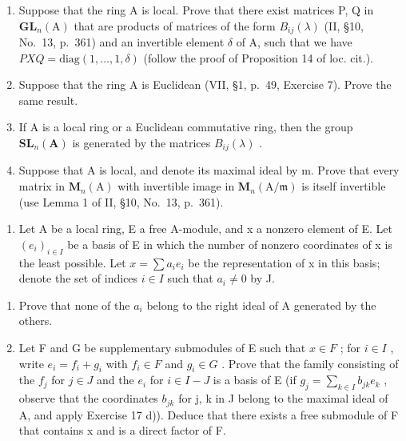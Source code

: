 \begin{enumerate}
\def\labelenumi{\alph{enumi})}
\item
  Suppose that the ring A is local. Prove that there exist matrices P, Q in \(\mathbf{GL}_{n}(\mathrm{A})\) that are products of matrices of the form \(B_{ij}(\lambda)\) (II, §10, No.~13, p.~361) and an invertible element \(\delta\) of A, such that we have \(PXQ = \text{diag}(1, \ldots, 1, \delta)\) (follow the proof of Proposition 14 of loc. cit.).
\item
  Suppose that the ring A is Euclidean (VII, §1, p.~49, Exercise 7). Prove the same result.
\item
  If \(\mathrm{A}\) is a local ring or a Euclidean commutative ring, then the group \(\mathbf{S}\mathbf{L}_n(\mathbf{A})\) is generated by the matrices \(B_{ij}(\lambda)\) .
\item
  Suppose that A is local, and denote its maximal ideal by m. Prove that every matrix in \(\mathbf{M}_{n}(\mathrm{A})\) with invertible image in \(\mathbf{M}_{n}(\mathrm{A}/\mathfrak{m})\) is itself invertible (use Lemma 1 of II, §10, No.~13, p.~361).
\end{enumerate}

\begin{enumerate}
\def\labelenumi{\arabic{enumi})}
\setcounter{enumi}{17}
\tightlist
\item
  Let A be a local ring, E a free A-module, and x a nonzero element of E. Let \((e_{i})_{i\in I}\) be a basis of E in which the number of nonzero coordinates of x is the least possible. Let \(x=\sum a_{i}e_{i}\) be the representation of x in this basis; denote the set of indices \(i\in I\) such that \(a_{i}\neq0\) by J.
\end{enumerate}

\begin{enumerate}
\def\labelenumi{\alph{enumi})}
\tightlist
\item
  Prove that none of the \(a_{i}\) belong to the right ideal of A generated by the others.
\item
  Let F and G be supplementary submodules of E such that \(x \in F\) ; for \(i \in I\) , write \(e_{i} = f_{i} + g_{i}\) with \(f_{i} \in F\) and \(g_{i} \in G\) . Prove that the family consisting of the \(f_{j}\) for \(j \in J\) and the \(e_{i}\) for \(i \in I - J\) is a basis of E (if \(g_{j} = \sum_{k \in I} b_{jk} e_{k}\) , observe that the coordinates \(b_{jk}\) for j, k in J belong to the maximal ideal of A, and apply Exercise 17 d)). Deduce that there exists a free submodule of F that contains x and is a direct factor of F.
\end{enumerate}

